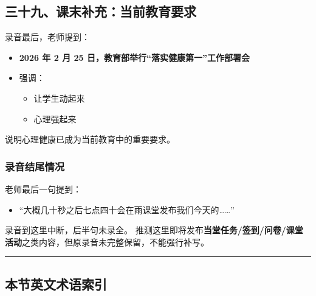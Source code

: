 \documentclass[
  chinese,
  9pt,
  a4paper,
]{ctexart}
\providecommand{\tightlist}{%
  \setlength{\itemsep}{0pt}\setlength{\parskip}{0pt}}
\begin{document}
\subsection{三十九、课末补充：当前教育要求}\label{ux4e09ux5341ux4e5dux8bfeux672bux8865ux5145ux5f53ux524dux6559ux80b2ux8981ux6c42}

录音最后，老师提到：

\begin{itemize}
\item
  \textbf{2026 年 2 月 25 日，教育部举行``落实健康第一''工作部署会}
\item
  强调：

  \begin{itemize}
  \tightlist
  \item
    让学生动起来
  \item
    心理强起来
  \end{itemize}
\end{itemize}

说明心理健康已成为当前教育中的重要要求。

\subsubsection{录音结尾情况}\label{ux5f55ux97f3ux7ed3ux5c3eux60c5ux51b5}

老师最后一句提到：

\begin{itemize}
\tightlist
\item
  ``大概几十秒之后七点四十会在雨课堂发布我们今天的\ldots\ldots{}''
\end{itemize}

录音到这里中断，后半句未录全。
推测这里即将发布\textbf{当堂任务/签到/问卷/课堂活动}之类内容，但原录音未完整保留，不能强行补写。

\begin{center}\rule{0.5\linewidth}{0.5pt}\end{center}

\subsection{本节英文术语索引}\label{ux672cux8282ux82f1ux6587ux672fux8bedux7d22ux5f15-1}
\end{document}
